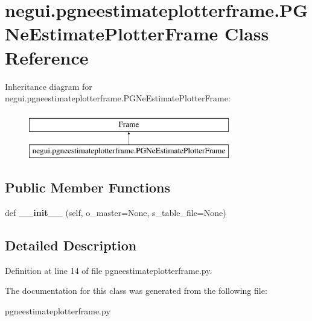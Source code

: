 \hypertarget{classnegui_1_1pgneestimateplotterframe_1_1PGNeEstimatePlotterFrame}{}\section{negui.\+pgneestimateplotterframe.\+P\+G\+Ne\+Estimate\+Plotter\+Frame Class Reference}
\label{classnegui_1_1pgneestimateplotterframe_1_1PGNeEstimatePlotterFrame}
Inheritance diagram for negui.\+pgneestimateplotterframe.\+P\+G\+Ne\+Estimate\+Plotter\+Frame\+:\begin{figure}[H]
\begin{center}
\leavevmode
\includegraphics[height=2.000000cm]{classnegui_1_1pgneestimateplotterframe_1_1PGNeEstimatePlotterFrame}
\end{center}
\end{figure}
\subsection*{Public Member Functions}
\begin{DoxyCompactItemize}
\item 
def {\bfseries \+\_\+\+\_\+init\+\_\+\+\_\+} (self, o\+\_\+master=None, s\+\_\+table\+\_\+file=None)\hypertarget{classnegui_1_1pgneestimateplotterframe_1_1PGNeEstimatePlotterFrame_adfb90a8643f8087754939471585c8541}{}\label{classnegui_1_1pgneestimateplotterframe_1_1PGNeEstimatePlotterFrame_adfb90a8643f8087754939471585c8541}

\end{DoxyCompactItemize}


\subsection{Detailed Description}


Definition at line 14 of file pgneestimateplotterframe.\+py.



The documentation for this class was generated from the following file\+:\begin{DoxyCompactItemize}
\item 
pgneestimateplotterframe.\+py\end{DoxyCompactItemize}
